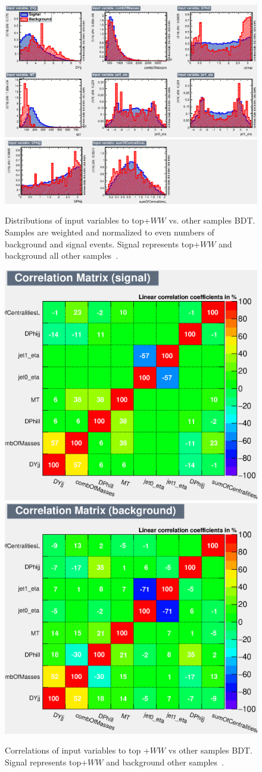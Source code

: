\begin{figure}[!htbp]
    \centering
    \includegraphics[width=0.7\linewidth]{Pictures/Top+WWvsEverything/variables_id_c1.eps}
    \includegraphics[width=0.7\linewidth]{Pictures/Top+WWvsEverything/variables_id_c2.eps}
    \caption{Distributions of input variables to top+$WW$ vs. other samples BDT. Samples are weighted and normalized to even numbers of background and signal events. Signal represents top+$WW$ and background all other samples~\cite{ourSupportNote}.}
    \label{fig:TopBDTinput}
\end{figure}
\begin{figure}[!htbp]
\centering
  \includegraphics[width=.45\linewidth]{Pictures/Top+WWvsEverything/CorrelationMatrixS.eps}
  \includegraphics[width=.45\linewidth]{Pictures/Top+WWvsEverything/CorrelationMatrixB.eps}
\caption{Correlations of input variables to top +$WW$ vs other samples BDT. Signal represents top+$WW$ and background other samples~\cite{ourSupportNote}.}
\label{fig:TopcorrSB}
\end{figure}
